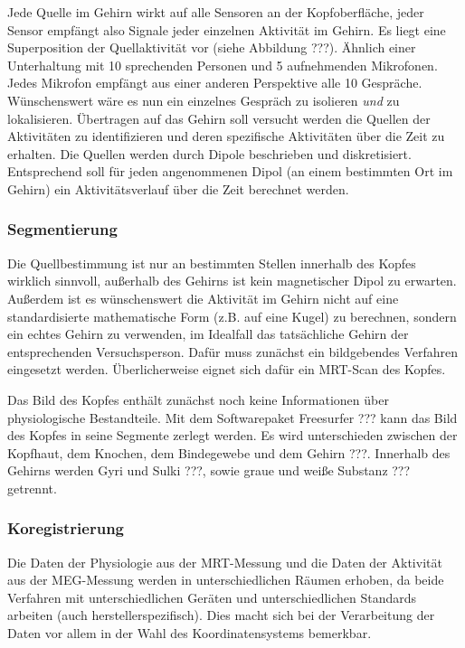 \documentclass[doc,a4paper,12pt]{apa6}
\begin{document}
Jede Quelle im Gehirn wirkt auf alle Sensoren an der Kopfoberfläche, jeder Sensor empfängt also Signale jeder einzelnen Aktivität im Gehirn. Es liegt eine Superposition der Quellaktivität vor (siehe Abbildung ???). Ähnlich einer Unterhaltung mit 10 sprechenden Personen und 5 aufnehmenden Mikrofonen. Jedes Mikrofon empfängt aus einer anderen Perspektive alle 10 Gespräche. Wünschenswert wäre es nun ein einzelnes Gespräch zu isolieren \emph{und} zu lokalisieren. Übertragen auf das Gehirn soll versucht werden die Quellen der Aktivitäten zu identifizieren und deren spezifische Aktivitäten über die Zeit zu erhalten. Die Quellen werden durch Dipole beschrieben und diskretisiert. Entsprechend soll für jeden angenommenen Dipol (an einem bestimmten Ort im Gehirn) ein Aktivitätsverlauf über die Zeit berechnet werden.

\subsubsection{Segmentierung}

Die Quellbestimmung ist nur an bestimmten Stellen innerhalb des Kopfes wirklich sinnvoll, außerhalb des Gehirns ist kein magnetischer Dipol zu erwarten. Außerdem ist es wünschenswert die Aktivität im Gehirn nicht auf eine standardisierte mathematische Form (z.B. auf eine Kugel) zu berechnen, sondern ein echtes Gehirn zu verwenden, im Idealfall das tatsächliche Gehirn der entsprechenden Versuchsperson. Dafür muss zunächst ein bildgebendes Verfahren eingesetzt werden. Überlicherweise eignet sich dafür ein MRT-Scan des Kopfes.

Das Bild des Kopfes enthält zunächst noch keine Informationen über physiologische Bestandteile. Mit dem Softwarepaket Freesurfer ??? kann das Bild des Kopfes in seine Segmente zerlegt werden. Es wird unterschieden zwischen der Kopfhaut, dem Knochen, dem Bindegewebe und dem Gehirn ???. Innerhalb des Gehirns werden Gyri und Sulki ???, sowie graue und weiße Substanz ??? getrennt.

\subsubsection{Koregistrierung}

Die Daten der Physiologie aus der MRT-Messung und die Daten der Aktivität aus der MEG-Messung werden in unterschiedlichen Räumen erhoben, da beide Verfahren mit unterschiedlichen Geräten und unterschiedlichen Standards arbeiten (auch herstellerspezifisch). Dies macht sich bei der Verarbeitung der Daten vor allem in der Wahl des Koordinatensystems bemerkbar.
\end{document}
